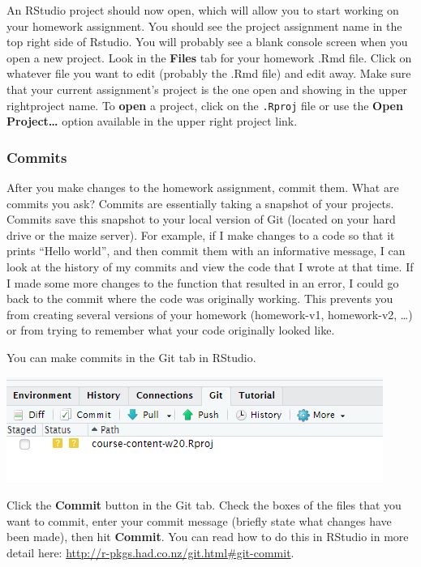 \documentclass[
]{book}
\begin{document}
An RStudio project should now open, which will allow you to start
working on your homework assignment. You should see the project
assignment name in the top right side of Rstudio. You will probably see
a blank console screen when you open a new project. Look in the
\textbf{Files} tab for your homework .Rmd file. Click on whatever file you
want to edit (probably the .Rmd file) and edit away. Make sure that your
current assignment's project is the one open and showing in the upper
rightproject name. To \textbf{open} a project, click on the \texttt{.Rproj} file or
use the \textbf{Open Project\ldots{}} option available in the upper right project
link.

\hypertarget{commits}{%
\subsubsection{Commits}\label{commits}}

After you make changes to the homework assignment, commit them. What are
commits you ask? Commits are essentially taking a snapshot of your
projects. Commits save this snapshot to your local version of Git
(located on your hard drive or the maize server). For example, if I make
changes to a code so that it prints ``Hello world'', and then commit them
with an informative message, I can look at the history of my commits and
view the code that I wrote at that time. If I made some more changes to
the function that resulted in an error, I could go back to the commit
where the code was originally working. This prevents you from creating
several versions of your homework (homework-v1, homework-v2, \ldots) or
from trying to remember what your code originally looked like.

You can make commits in the Git tab in RStudio.

\includegraphics{img/maize_gittab.png}

Click the \textbf{Commit} button in the Git tab. Check the boxes of the files
that you want to commit, enter your commit message (briefly state what
changes have been made), then hit \textbf{Commit}. You can read how to do
this in RStudio in more detail here:
\url{http://r-pkgs.had.co.nz/git.html\#git-commit}.
\end{document}

